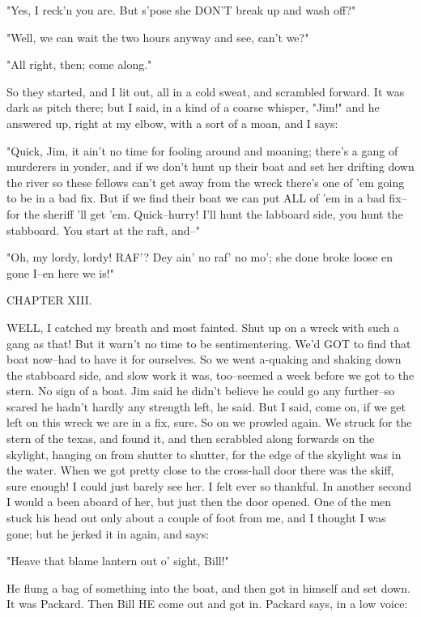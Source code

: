 "Yes, I reck'n you are.  But s'pose she DON'T break up and wash off?"

"Well, we can wait the two hours anyway and see, can't we?"

"All right, then; come along."

So they started, and I lit out, all in a cold sweat, and scrambled
forward. It was dark as pitch there; but I said, in a kind of a coarse
whisper, "Jim!" and he answered up, right at my elbow, with a sort of a
moan, and I says:

"Quick, Jim, it ain't no time for fooling around and moaning; there's a
gang of murderers in yonder, and if we don't hunt up their boat and set
her drifting down the river so these fellows can't get away from the
wreck there's one of 'em going to be in a bad fix.  But if we find their
boat we can put ALL of 'em in a bad fix--for the sheriff 'll get 'em.
Quick--hurry!  I'll hunt the labboard side, you hunt the stabboard.
You start at the raft, and--"

"Oh, my lordy, lordy!  RAF'?  Dey ain' no raf' no mo'; she done broke
loose en gone I--en here we is!"




CHAPTER XIII.

WELL, I catched my breath and most fainted.  Shut up on a wreck with such
a gang as that!  But it warn't no time to be sentimentering.  We'd GOT to
find that boat now--had to have it for ourselves.  So we went a-quaking
and shaking down the stabboard side, and slow work it was, too--seemed a
week before we got to the stern.  No sign of a boat.  Jim said he didn't
believe he could go any further--so scared he hadn't hardly any strength
left, he said.  But I said, come on, if we get left on this wreck we are
in a fix, sure.  So on we prowled again.  We struck for the stern of the
texas, and found it, and then scrabbled along forwards on the skylight,
hanging on from shutter to shutter, for the edge of the skylight was in
the water.  When we got pretty close to the cross-hall door there was the
skiff, sure enough!  I could just barely see her.  I felt ever so
thankful.  In another second I would a been aboard of her, but just then
the door opened.  One of the men stuck his head out only about a couple
of foot from me, and I thought I was gone; but he jerked it in again, and
says:

"Heave that blame lantern out o' sight, Bill!"

He flung a bag of something into the boat, and then got in himself and
set down.  It was Packard.  Then Bill HE come out and got in.  Packard
says, in a low voice:

